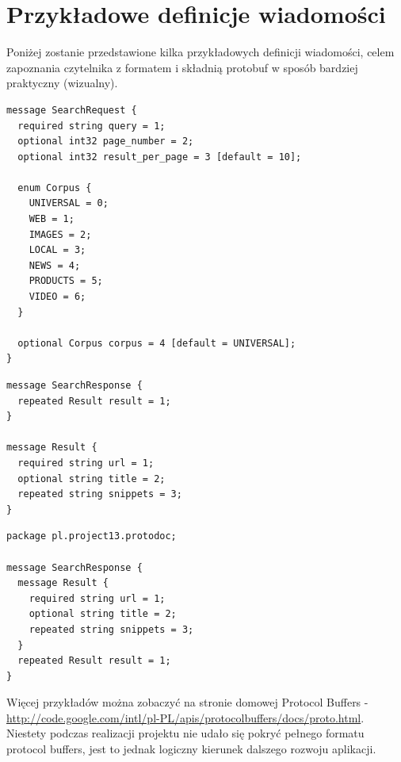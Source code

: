 \section{Przykładowe definicje wiadomości}
\label{sec:proto_file_examples}

Poniżej zostanie przedstawione kilka przykładowych definicji wiadomości, celem zapoznania czytelnika z formatem i składnią protobuf w
sposób bardziej praktyczny (wizualny).

\begin{lstlisting}[caption={Definicja wiadomości zawierająca enum oraz wartości domyślne}]
message SearchRequest {
  required string query = 1;
  optional int32 page_number = 2;
  optional int32 result_per_page = 3 [default = 10];

  enum Corpus {
    UNIVERSAL = 0;
    WEB = 1;
    IMAGES = 2;
    LOCAL = 3;
    NEWS = 4;
    PRODUCTS = 5;
    VIDEO = 6;
  }

  optional Corpus corpus = 4 [default = UNIVERSAL];
}
\end{lstlisting}

\begin{lstlisting}[caption={Definicja wiadoomści wykorzystującej inną wiadomość}]
message SearchResponse {
  repeated Result result = 1;
}

message Result {
  required string url = 1;
  optional string title = 2;
  repeated string snippets = 3;
}
\end{lstlisting}

\newpage
\begin{lstlisting}[caption={Definicja wiadomości korzystającej z wewnętrznej wiadomości}]
package pl.project13.protodoc;

message SearchResponse {
  message Result {
    required string url = 1;
    optional string title = 2;
    repeated string snippets = 3;
  }
  repeated Result result = 1;
}
\end{lstlisting}

Więcej przykładów można zobaczyć na stronie domowej Protocol Buffers - \href{http://code.google.com/intl/pl-PL/apis/protocolbuffers/docs/proto.html}{http://code.google.com/intl/pl-PL/apis/protocolbuffers/docs/proto.html}.
Niestety podczas realizacji projektu nie udało się pokryć pełnego formatu protocol buffers, jest to jednak logiczny kierunek dalszego rozwoju aplikacji.
